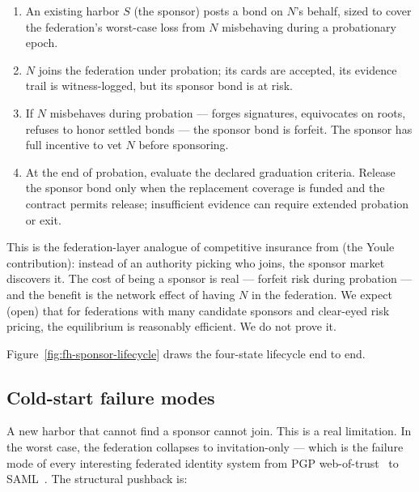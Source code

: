 \documentclass[11pt,a4paper]{article}
\theoremstyle{definition}
\theoremstyle{remark}
\begin{document}
%
\begin{enumerate}[nosep]
\item An existing harbor $S$ (the sponsor) posts a bond on $N$'s behalf, sized to cover the federation's worst-case loss from $N$ misbehaving during a probationary epoch.
\item $N$ joins the federation under probation; its cards are accepted, its evidence trail is witness-logged, but its sponsor bond is at risk.
\item If $N$ misbehaves during probation --- forges signatures, equivocates on roots, refuses to honor settled bonds --- the sponsor bond is forfeit. The sponsor has full incentive to vet $N$ before sponsoring.
\item At the end of probation, evaluate the declared graduation criteria. Release
the sponsor bond only when the replacement coverage is funded and the contract
permits release; insufficient evidence can require extended probation or exit.
\end{enumerate}

This is the federation-layer analogue of competitive insurance from  (the Youle contribution): instead of an authority picking who joins, the sponsor market discovers it. The cost of being a sponsor is real --- forfeit risk during probation --- and the benefit is the network effect of having $N$ in the federation. We expect (open) that for federations with many candidate sponsors and clear-eyed risk pricing, the equilibrium is reasonably efficient. We do not prove it.

Figure~\ref{fig:fh-sponsor-lifecycle} draws the four-state lifecycle end to end.



\subsection{Cold-start failure modes}\label{sec:fh-cold-start}

A new harbor that cannot find a sponsor cannot join. This is a real limitation. In the worst case, the federation collapses to invitation-only --- which is the failure mode of every interesting federated identity system from PGP web-of-trust~ to SAML~. The structural pushback is:
\end{document}
